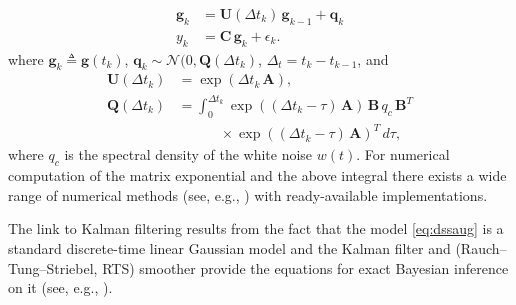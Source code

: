 \documentclass[journal]{IEEEtran}
\begin{document}
%
\begin{equation}
\begin{split}
  \mathbf{g}_k
  &= \mathbf{U}(\Delta t_k) \, \mathbf{g}_{k-1}
  + \mathbf{q}_k \\
  y_k &= \mathbf{C} \, \mathbf{g}_k + \epsilon_k.
\end{split}
\label{eq:dssaug}
\end{equation}
%
where $\mathbf{g}_k \triangleq \mathbf{g}(t_k)$, $\mathbf{q}_k \sim \mathcal{N}(0,\mathbf{Q}(\Delta t_k)$, $\Delta_t = t_k - t_{k-1}$, and
%
\begin{equation}
\begin{split}
  \mathbf{U}(\Delta t_k)  &= \exp(\Delta t_k \, \mathbf{A}), \\
  \mathbf{Q}(\Delta t_k) &= \int_0^{\Delta t_k} \exp((\Delta t_k - \tau) \, \mathbf{A}) \,
  \mathbf{B} \, q_c  \, \mathbf{B}^T \\
  &\qquad \quad \times \exp((\Delta t_k - \tau) \, \mathbf{A})^T \, d\tau,
\end{split}
\label{eq:dssaug}
\end{equation}
%
where $q_c$ is the spectral density of the white noise $w(t)$. For numerical computation of the matrix exponential and the above integral there exists a wide range of numerical methods (see, e.g., \cite{Grewal+Andrews:2001,Sarkka:2006}) with ready-available implementations.

The link to Kalman filtering results from the fact that the model \eqref{eq:dssaug} is a standard discrete-time linear Gaussian model and the Kalman filter and (Rauch--Tung--Striebel, RTS) smoother provide the equations for exact Bayesian inference on it (see, e.g., \cite{Sarkka:2013}). 
\end{document}
